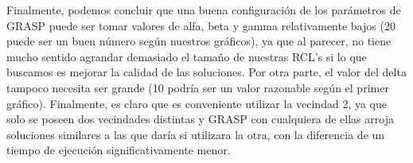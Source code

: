 \documentclass[a4paper]{article}
\begin{document}
Finalmente, podemos concluir que una buena configuración de los parámetros de GRASP puede ser tomar valores de alfa, beta y gamma relativamente bajos (20 puede ser un buen número según nuestros gráficos), ya que al parecer, no tiene mucho sentido agrandar demasiado el tamaño de nuestras RCL's si lo que buscamos es mejorar la calidad de las soluciones. Por otra parte, el valor del delta tampoco necesita ser grande (10 podría ser un valor razonable según el primer gráfico). Finalmente, es claro que es conveniente utilizar la vecindad 2, ya que solo se poseen dos vecindades distintas y GRASP con cualquiera de ellas arroja soluciones similares a las que daría si utilizara la otra, con la diferencia de un tiempo de ejecución significativamente menor.
\end{document}
